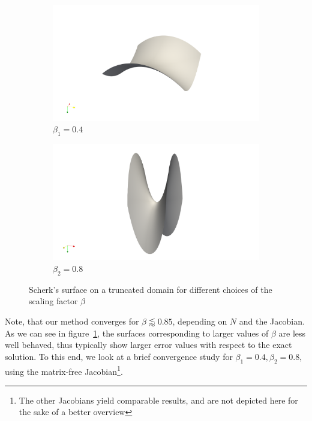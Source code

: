 \documentclass[11pt]{scrartcl}
\begin{document}
\begin{figure}[h!]
	\centering
	\begin{subfigure}{.49\linewidth}
		\includegraphics[width=\linewidth]{figs/scherk_beta4}
		\caption{$\beta_1=0.4$}
	\end{subfigure}
	\hfill
	\begin{subfigure}{.49\linewidth}
		\includegraphics[width=\linewidth]{figs/scherk_beta8}
		\caption{$\beta_2=0.8$}
	\end{subfigure}
	\caption{Scherk's surface on a truncated domain for different choices of the scaling factor $\beta$}\label{fig:scherks}
\end{figure}

Note, that our method converges for $\beta \lessapprox 0.85$, depending on $N$ and the Jacobian.
As we can see in figure~\ref{fig:scherks}, the surfaces corresponding to larger values of $\beta$ are less well behaved, thus typically show larger error values with respect to the exact solution. 
To this end, we look at a brief convergence study for $\beta_1=0.4, \beta_2=0.8$, using the matrix-free Jacobian\footnote{The other Jacobians yield comparable results, and are not depicted here for the sake of a better overview}.
\end{document}
